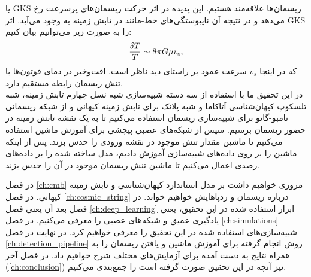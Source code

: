  یا GKS ریسمان‌ها علاقه‌مند هستیم. 
  \cite{kaiser1984microwave, gott1985gravitational}
این پدیده در اثر حرکت ریسمان‌های پرسرعت رخ می‌دهد و در نتیجه آن ناپیوستگی‌های خط-مانند در تابش زمینه به وجود می‌آید. اثر GKS را به صورت زیر می‌توانیم بیان کنیم:
\begin{equation}
	\frac{\delta T}{T} \sim 8\pi
	G\mu v_{\mathrm{s}},
\end{equation}
که در اینجا $v_s$ سرعت عمود بر راستای دید ناظر است. افت‌وخیر در دمای فوتون‌ها با تنش ریسمان رابطه مستقیم دارد. \\
در این تحقیق ما با استفاده از سه دسته شبیه‌سازی شبه نسل چهارم تابش زمینه، شبه تلسکوپ کیهان‌شناسی آتاکاما و شبه پلانک برای تابش زمینه کیهانی و از شبکه ریسمانی نامبو-گاتو برای شبیه‌سازی ریسمان استفاده می‌کنیم تا به یک نقشه تابش زمینه در حضور ریسمان برسیم. سپس از شبکه‌های عصبی پیچشی برای آموزش ماشین استفاده می‌کنیم تا ماشین مقدار تنش موجود در نقشه ورودی را حدس بزند. پس از اینکه ماشین را بر روی داده‌های شبیه‌سازی آموزش دادیم، مدل ساخته شده را بر داده‌های رصدی اعمال می‌کنیم تا ماشین تنش ریسمان موجود در آن را حدس بزند. 
\par
در فصل 
\ref{ch:cmb}
مروری خواهیم داشت بر مدل استاندارد کیهان‌شناسی و تابش زمینه کیهانی. در فصل
\ref{ch:cosmic_string}
درباره ریسمان و ردپاهایش خواهیم خواند. در فصل بعد آن یعنی فصل 
\ref{ch:deep_learning}
ابزار استفاده شده در این تحقیق، یعنی یادگیری عمیق و شبکه‌های عصبی را معرفی می‌کنیم. در فصل
\ref{ch:simulations}
شبیه‌سازی‌های استفاده شده در این تحقیق را معرفی خواهیم کرد. در نهایت در فصل 
\ref{ch:detection_pipeline}
روش انجام گرفته برای آموزش ماشین و یافتن ریسمان را به همراه نتایج به دست آمده برای آزمایش‌های مختلف شرح خواهیم داد. در فصل آخر 
(\ref{ch:conclusion})
نیز آنچه در این تحقیق صورت گرفته است را جمع‌بندی می‌کنیم.


